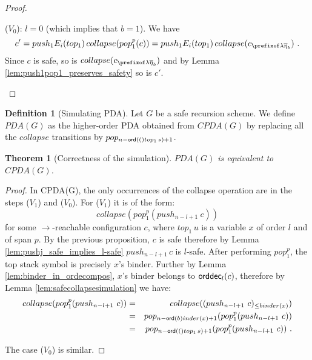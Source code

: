 \documentclass[a4paper]{article}
\newtheorem{theorem}{Theorem}[section]
\theoremstyle{remark}
\theoremstyle{definition}
\newtheorem{definition}{Definition}[section]
\newcommand\orddec{{\sf orddec}}
\begin{document}
\begin{proof}
\begin{itemize}
\begin{compactitem}
\item ($V_0$): $l=0$ (which implies that  $b=1$). We have 
 $$c' = push_1 E_i(top_1)\,collapse(pop_1^p(c)) =
push_1 E_i(top_1)\,collapse(c_{\prefixof \lambda \overline\eta_b}) \ .$$
Since $c$ is safe, so is $collapse(c_{\prefixof \lambda \overline\eta_b})$ and
by Lemma \ref{lem:push1pop1_preserves_safety} so is $c'$.
\qedhere
\end{compactitem}
\end{itemize}
\end{proof}

\begin{definition}[Simulating PDA]
Let $G$ be a safe recursion scheme.
We define $PDA(G)$ as the higher-order PDA obtained from
$CPDA(G)$ by replacing all the $collapse$ transitions by $pop_{n-{\sf ord}(()top_1\,s)+1}$.
\end{definition}

\begin{theorem}[Correctness of the simulation]
$PDA(G)$ is equivalent to $CPDA(G)$.
\end{theorem}
\begin{proof}
In CPDA(G), the only occurrences of the collapse operation are in the steps ($V_1$) and ($V_0$). For ($V_1$) it is of the form:
$$collapse(pop_1^p(push_{n-l+1}~c))$$
for some $\rightarrow$-reachable configuration $c$, where $top_1\,u$ is a variable $x$ of order $l$ and of span $p$.
By the previous proposition, $c$ is safe therefore by Lemma \ref{lem:pushj_safe_implies_l-safe} $push_{n-l+1}\, c$ is $l$-safe. After performing $pop_1^p$, the top stack symbol is precisely $x$'s binder. Further
by Lemma \ref{lem:binder_in_ordecompos}, $x$'s binder belongs to $\orddec_l(c)$, therefore 
by Lemma \ref{lem:safecollapsesimulation} we have:
\begin{eqnarray*}
collapse(pop_1^p(push_{n-l+1}~c)) &=&  collapse((push_{n-l+1}~c)_{\leq binder(x)}) \\
&=& pop_{n-{\sf ord}(b)inder(x) +1} ( pop_1^p(push_{n-l+1}~c) ) \\
&=& pop_{n-{\sf ord}(()top_1\,s) +1} ( pop_1^p(push_{n-l+1}~c) ) \ .
\end{eqnarray*}

The case ($V_0$) is similar.
\end{proof}




\end{document}
